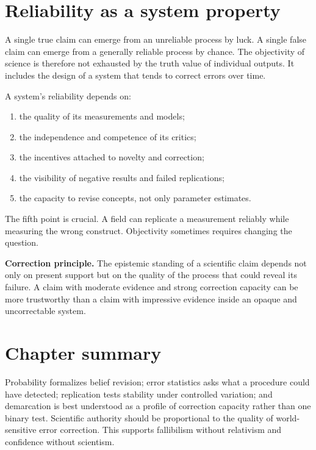 \section{Reliability as a system property}

A single true claim can emerge from an unreliable process by luck. A single
false claim can emerge from a generally reliable process by chance. The
objectivity of science is therefore not exhausted by the truth value of
individual outputs. It includes the design of a system that tends to correct
errors over time.

A system's reliability depends on:

\begin{enumerate}
\item the quality of its measurements and models;
\item the independence and competence of its critics;
\item the incentives attached to novelty and correction;
\item the visibility of negative results and failed replications;
\item the capacity to revise concepts, not only parameter estimates.
\end{enumerate}

The fifth point is crucial. A field can replicate a measurement reliably while
measuring the wrong construct. Objectivity sometimes requires changing the
question.

\begin{principlebox}
\textbf{Correction principle.} The epistemic standing of a scientific claim
depends not only on present support but on the quality of the process that
could reveal its failure. A claim with moderate evidence and strong correction
capacity can be more trustworthy than a claim with impressive evidence inside
an opaque and uncorrectable system.
\end{principlebox}

\section*{Chapter summary}

Probability formalizes belief revision; error statistics asks what a procedure
could have detected; replication tests stability under controlled variation;
and demarcation is best understood as a profile of correction capacity rather
than one binary test. Scientific authority should be proportional to the
quality of world-sensitive error correction. This supports fallibilism without
relativism and confidence without scientism.

